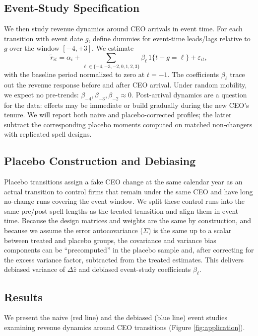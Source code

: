 \documentclass[11pt,a4paper]{article}
\begin{document}
\subsection*{Event-Study Specification}
We then study revenue dynamics around CEO arrivals in event time. For each transition with event date \(g\), define dummies for event-time leads/lags relative to \(g\) over the window \([-4,+3]\). We estimate
\begin{equation}
\tilde r_{it} = \alpha_i + \sum_{\ell\in\{-4,-3,-2,0,1,2,3\}} \beta_{\ell}\, 1\{t-g=\ell\} + \varepsilon_{it},
\end{equation}
with the baseline period normalized to zero at \(t=-1\). The coefficients \(\beta_{\ell}\) trace out the revenue response before and after CEO arrival. Under random mobility, we expect no pre-trends: \(\beta_{-4},\beta_{-3},\beta_{-2}\approx 0\). Post-arrival dynamics are a question for the data: effects may be immediate or build gradually during the new CEO’s tenure. We will report both naive and placebo-corrected profiles; the latter subtract the corresponding placebo moments computed on matched non-changers with replicated spell designs.

\subsection*{Placebo Construction and Debiasing}
Placebo transitions assign a fake CEO change at the same calendar year as an actual transition to control firms that remain under the same CEO and have long no-change runs covering the event window. We split these control runs into the same pre/post spell lengths as the treated transition and align them in event time. Because the design matrices and weights are the same by construction, and because we assume the error autocovariance (\(\Sigma\)) is the same up to a scalar between treated and placebo groups, the covariance and variance bias components can be ``precomputed'' in the placebo sample and, after correcting for the excess variance factor, subtracted from the treated estimates. This delivers debiased variance of \(\Delta \hat z\) and debiased event-study coefficients \(\beta_{\ell}\).


\subsection*{Results}

We present the naive (red line) and the debiased (blue line) event studies examining revenue dynamics around CEO transitions (Figure \ref{fig:application}). 
\end{document}
